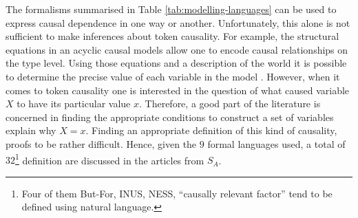 \documentclass[11pt,a4paper]{book}
\theoremstyle{definition}
\theoremstyle{definition}
\theoremstyle{definition}
\theoremstyle{remark}
\newcommand{\prset}{S_{A}}
\begin{document}
The formalisms summarised in Table \ref{tab:modelling-languages} can be used to express causal dependence in one way or another. Unfortunately, this alone is not sufficient to make inferences about token causality.
For example, the structural equations in an acyclic causal models allow one to encode causal relationships on the type level. Using those equations and a description of the world it is possible to determine the precise value 
of each variable in the model \parencite{halpern2015cause}. However, when it comes to token causality one is interested in the question of what caused variable $X$ to have its particular value $x$. Therefore, a good part of the literature is concerned in finding the appropriate conditions to construct a set of variables explain why $X=x$. Finding an appropriate definition of this kind of causality, proofs to be rather difficult. Hence, given the $9$ formal languages used, a total of $32$\footnote{Four of them But-For, INUS, NESS, ``causally relevant factor'' tend to be defined using natural language.} definition are discussed in the articles from $\prset$.
\end{document}
